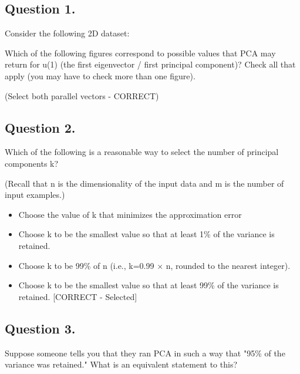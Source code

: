 \documentclass[11pt]{article} %
\begin{document}
\subsection{ Question 1. }

Consider the following 2D dataset:


Which of the following figures correspond to possible values that PCA may return for u(1) (the first eigenvector / first principal component)? 
Check all that apply (you may have to check more than one figure).

(Select both parallel vectors - CORRECT)








\subsection{ Question 2. }
Which of the following is a reasonable way to select the number of principal components k?

(Recall that n is the dimensionality of the input data and m is the number of input examples.)

\begin{itemize}
	\item Choose the value of k that minimizes the approximation error %
	
	\item Choose k to be the smallest value so that at least 1\% of the variance is retained.
	
	\item Choose k to be 99\% of n (i.e., k=0.99 $\times$ n, rounded to the nearest integer).
	
	\item Choose k to be the smallest value so that at least 99\% of the variance is retained. [CORRECT - Selected]
	
\end{itemize}
\subsection{ Question 3. }
Suppose someone tells you that they ran PCA in such a way that "95\% of the variance was retained." What is an equivalent statement to this?
\end{document}
